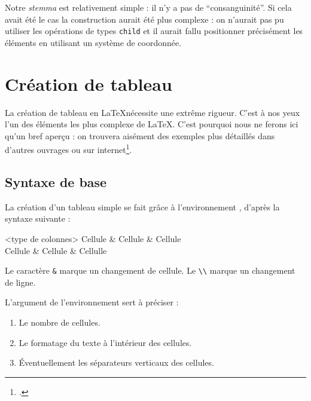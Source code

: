 Notre \emph{stemma} est relativement simple : il n'y a pas de \enquote{consanguinité}. Si cela avait été le cas la construction aurait été plus complexe : on n'aurait pas pu utiliser les opérations de types \verb|child| et il aurait fallu positionner précisément les éléments en utilisant un système de coordonnée.



\section{Création de tableau}

\begin{attention}
La création de tableau en \LaTeX nécessite  une extrême rigueur. 
C'est à nos yeux l'un des éléments les plus complexe de \LaTeX. C'est pourquoi nous ne ferons ici qu'un bref aperçu : on trouvera aisément des exemples plus détaillés dans d'autres ouvrages ou sur internet\footcite[On pourra consulter des fichiers assez didactiques :][]{bebert_tableaux}.

\end{attention}

\subsection{Syntaxe de base}

La création d'un tableau simple se fait grâce à l'environnement , d'après la syntaxe suivante :

\begin{latexcode}
\begin{tabular}{<type de colonnes>}
	Cellule & Cellule & Cellule \\
	Cellule & Cellule & Cellulle \\
\end{tabular}
\end{latexcode}

Le caractère \verb|&| marque un changement de cellule. Le \verb|\\| marque un changement de ligne.

L'argument  de l'environnement  sert à préciser :
\begin{enumerate}
	\item Le nombre de cellules.
	\item Le formatage du texte à l'intérieur des cellules.
	\item Éventuellement les séparateurs verticaux des cellules.
	
\end{enumerate}

